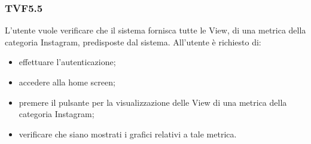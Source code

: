 		\subsubsection{TVF5.5}
			L'utente vuole verificare che il sistema fornisca tutte le View, di una metrica della categoria Instagram, predisposte dal sistema. All'utente è richiesto di:
			\begin{itemize}
				\item effettuare l'autenticazione;
				\item accedere alla home screen;
				\item premere il pulsante per la visualizzazione delle View di una metrica della categoria Instagram;
				\item verificare che siano mostrati i grafici relativi a tale metrica.
			\end{itemize}
			
